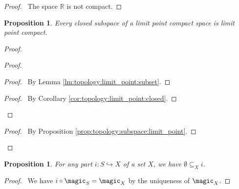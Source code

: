 \documentclass{report}
\let\qed\relax
\newtheorem{prop}[lm]{Proposition}
\theoremstyle{definition}
\begin{document}
\begin{proof}
  \pf\ The space $\mathbb{R}$ is not compact. \qed
\end{proof}

\begin{prop}
  Every closed subspace of a limit point compact space is limit point compact.
\end{prop}

\begin{proof}
  \pf
  \begin{proof}
    \begin{proof}
      \pf\ By Lemma \ref{lm:topology:limit_point:subset}.
    \end{proof}
    \qedstep
    \begin{proof}
      \pf\ By Corollary \ref{cor:topology:limit_point:closed}.
    \end{proof}
  \end{proof}
  \begin{proof}
    \pf\ By Proposition \ref{prop:topology:subspace:limit_point}.
  \end{proof}
  \qed
\end{proof}

\begin{prop}
  For any part $i : S \hookrightarrow X$ of a set $X$, we have $\emptyset \subseteq_X i$.
\end{prop}

\begin{proof}
  \pf\ We have $i \circ \magic_S = \magic_X$ by the uniqueness of $\magic_X$. \qed
\end{proof}
\end{document}
